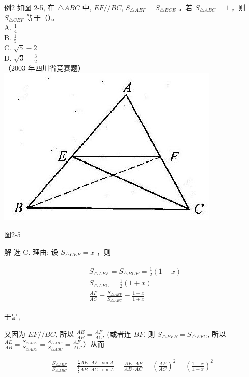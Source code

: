 \documentclass[10pt]{article}
\begin{document}
例2 如图 2-5, 在 $\triangle A B C$ 中, $E F / / B C$, $S_{\triangle A E F}=S_{\triangle B C E}$ 。若 $S_{\triangle A B C}=1$ ，则 $S_{\triangle C E F}$ 等于（）。\\
A. $\frac{1}{4}$\\
B. $\frac{1}{5}$\\
C. $\sqrt{5}-2$\\
D. $\sqrt{3}-\frac{3}{2}$\\
（2003 年四川省竞赛题）\\
\includegraphics[max width=\textwidth, center]{2024_10_30_2c8f45efd4a519b08e1ag-018(1)}

图2-5

解 选 C. 理由: 设 $S_{\triangle C E F}=x$ ，则

\begin{align*}
\begin{aligned}
& S_{\triangle A E F}=S_{\triangle B C E}=\frac{1}{2}(1-x) \\
& S_{\triangle A E C}=\frac{1}{2}(1+x) \\
& \frac{A F}{A C}=\frac{S_{\triangle A E F}}{S_{\triangle A E C}}=\frac{1-x}{1+x}
\end{aligned}
\end{align*}

于是,

又因为 $E F / / B C$, 所以 $\frac{A E}{A B}=\frac{A F}{A C}$, (或者连 $B F$, 则 $S_{\triangle E F B}=S_{\triangle E F C}$, 所以 $\frac{A E}{A B}=\frac{S_{\triangle A E C}}{S_{\triangle A B C}}=\frac{S_{\triangle A B F}}{S_{\triangle A B C}}=\frac{A F}{A C}$.）从而

\begin{align*}
\frac{S_{\triangle A E F}}{S_{\triangle A B C}}=\frac{\frac{1}{2} A E \cdot A F \cdot \sin A}{\frac{1}{2} A B \cdot A C \cdot \sin A}=\frac{A E \cdot A F}{A B \cdot A C}=\left(\frac{A F}{A C}\right)^{2}=\left(\frac{1-x}{1+x}\right)^{2}
\end{align*}
\end{document}
